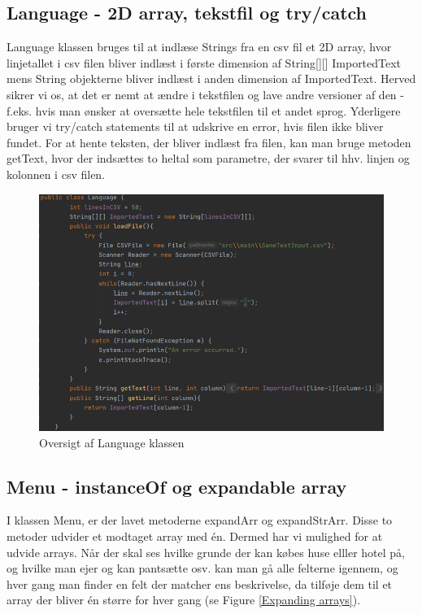 \begin{flushleft}
\subsection{Language - 2D array, tekstfil og try/catch}
Language klassen bruges til at indlæse Strings fra en csv fil et 2D array, hvor linjetallet i csv filen bliver indlæst i første dimension af String[][] ImportedText mens String objekterne bliver indlæst i anden dimension af ImportedText. Herved sikrer vi os, at det er nemt at ændre i tekstfilen og lave andre versioner af den - f.eks. hvis man ønsker at oversætte hele tekstfilen til et andet sprog. Yderligere bruger vi try/catch statements til at udskrive en error, hvis filen ikke bliver fundet. For at hente teksten, der bliver indlæst fra filen, kan man bruge metoden getText, hvor der indsættes to heltal som parametre, der svarer til hhv. linjen og kolonnen i csv filen.
\begin{figure}[htp] %
    \centering
    \includegraphics[width=14cm]{Report/figures/Codesections/Language_Language.png}
    \caption{Oversigt af Language klassen}
    \label{LanguageKlasse}
\end{figure}

\subsection{Menu - instanceOf og expandable array}
I klassen Menu, er der lavet metoderne expandArr og expandStrArr. Disse to metoder udvider et modtaget array med én. Dermed har vi mulighed for at udvide arrays. Når der skal ses hvilke grunde der kan købes huse elller hotel på, og hvilke man ejer og kan pantsætte osv. kan man gå alle felterne igennem, og hver gang man finder en felt der matcher ens beskrivelse, da tilføje dem til et array der bliver én større for hver gang (se Figure \ref{Expanding arrays}).


\end{flushleft}
